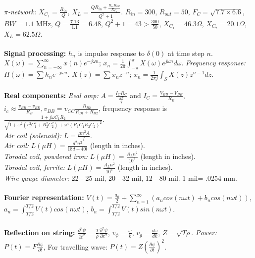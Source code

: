 \\
$\pi$\emph{-network:} $X_{C_1} = {\frac {R_{in}} {Q}}$,
$X_{L} = {\frac {QR_{in} + {\frac {R_{in}R_{out}} {X_{C_2}}}}
{Q^2+1}}$.
$R_{in} = 300$, $R_{out}= 50$, $F_C= \sqrt{7.7 \times 6.6}$,
$BW= 1.1$ MHz, $Q= {\frac {7.13}{1.1}}=6.48$,
$Q^2+1=43 > {\frac {300} {50}}$,
$X_{C_1} = 46.3 \Omega$,
$X_{C_2} = 20.1 \Omega$,
$X_{L} = 62.5 \Omega$.
\\
\\
{\bf Signal processing:} $h_n$ is impulse response to $\delta(0)$ at time step $n$.
$X( \omega ) = \sum_{n=-\infty}^{\infty} x(n) e^{-j \omega n}$; 
$x_n = {\frac 1 {2 \pi}} \int_{- \pi}^{\pi} X( \omega ) e^{j \omega n} d \omega$.
\emph{Frequency response:} $H( \omega ) = \sum h_n e^{-j \omega n}$.
$X(z)= \sum x_n z^{-n}$; $x_n = {\frac 1 {2 \pi j}} \int_S X(z) z^{n-1} dz$.
\\
\\
{\bf Real components:}
\emph{Real amp:}
$A= {\frac {I_C R_C} {\frac {kT} {q}}}$ and $I_C= {\frac {V_{BB}-V_{BE}} {R_E}}$,
$i_{c} \approx {\frac {v_{BB}-v_{BE}} {R_E}}, v_{BB}= v_{CC} {\frac {R_{B2}} {R_{B1}+R_{B2}}}$,
frequency response is ${\frac {1+j \omega C_1 R_2 }
{\sqrt{1+ \omega^2(r_1^2C_1^2+R_2^2C_2^2)+\omega^4(R_1C_1R_2C_2)^2}}}$.
\\
\emph{Air coil (solenoid):} $L=  {\frac {\mu n^2 A}{l}}$.
\\
\emph{Air coil:} $L(\mu H)= {\frac {d^2 n^2}{18d+40l}}$ (length in inches).
\\
\emph{Torodal coil, powdered iron:} $L(\mu H)= {\frac {A_L n^2}{10^3}}$ (length in inches).
\\
\emph{Torodal coil, ferrite:} $L(\mu H)= {\frac {A_L n^2}{10^6}}$ (length in inches). 
\\
\emph{Wire gauge
diameter:} 22 - 25 mil, 20 - 32 mil, 12 - 80 mil.  1 mil= .0254 mm.
\\
\\
{\bf Fourier representation:} $V(t)= {\frac {a_0}{2}} + \sum_{n=1}^{\infty} (
a_n cos(n \omega t) + b_n cos(n \omega t))$, 
$a_n= \int_{T/2}^{T/2} V(t) cos(n \omega t)$,
$b_n= \int_{T/2}^{T/2} V(t) sin(n \omega t)$.
\\
\\
{\bf Reflection on string:}
$ {\frac {\partial^2 \psi} {\partial t^2}} =
{\frac T {\rho}} {\frac {\partial^2 \psi} {\partial x^2}}$,
$v_{\phi}={\frac \omega k}$,
$v_{g}={\frac {d\omega} {dk}}$, $Z= {\sqrt {T \rho}}$.
\emph{Power:} $P(t)= F {\frac {\partial \psi} {\partial t}}$,
For travelling wave:
$P(t)= Z({\frac {\partial \psi} {\partial t}})^2$.
